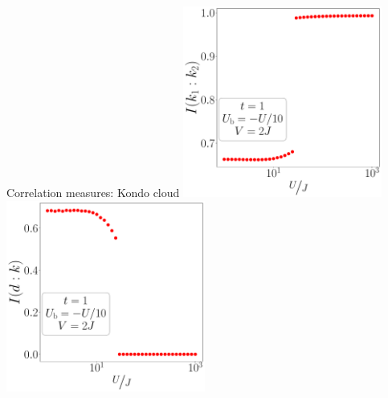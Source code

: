 \documentclass[aspectratio=169]{beamer}
\begin{document}
\begin{frame}[noframenumbering]{Correlation measures: Kondo cloud}
\vspace*{20pt}
\includegraphics[width=0.49\textwidth]{./figures/corr-k-t=1.000,J=10.000,0.000,40,V=3J,Ubath=-U_by_10,N=4,U=1.000,1000.000,40.pdf}
\includegraphics[width=0.49\textwidth]{./figures/mi-dk-t=1.000,J=10.000,0.000,40,V=3J,Ubath=-U_by_10,N=4,U=1.000,1000.000,40.pdf}
\end{frame}
\end{document}
